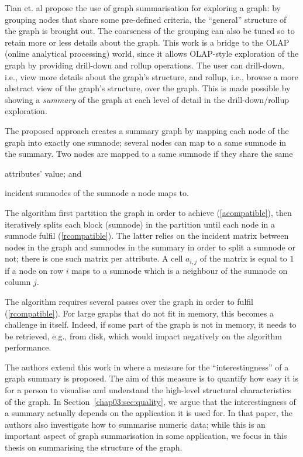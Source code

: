 Tian et. al \cite{tian:sigmod:2008} propose the use of graph summarisation for exploring a graph: by grouping nodes that share some pre-defined criteria, the ``general'' structure of the graph is brought out. The coarseness of the grouping can also be tuned so to retain more or less details about the graph. This work is a bridge to the OLAP (online analytical processing) world, since it allows OLAP-style exploration of the graph by providing drill-down and rollup operations. The user can drill-down, i.e., view more details about the graph's structure, and rollup, i.e., browse a more abstract view of the graph's structure, over the graph. This is made possible by showing a \emph{summary} of the graph at each level of detail in the drill-down/rollup exploration.

The proposed approach creates a summary graph by mapping each node of the graph into exactly one sumnode; several nodes can map to a same sumnode in the summary. Two nodes are mapped to a same sumnode if they share the same
\begin{inparaenum}[(a)]
	\item attributes' value; and
	\label{acompatible}
	\item incident sumnodes of the sumnode a node maps to.
	\label{rcompatible}
\end{inparaenum}
The algorithm first partition the graph in order to achieve (\ref{acompatible}), then iteratively splits each block (sumnode) in the partition until each node in a sumnode fulfil (\ref{rcompatible}). The latter relies on the incident matrix between nodes in the graph and sumnodes in the summary in order to split a sumnode or not; there is one such matrix per attribute. A cell $a_{i,j}$ of the matrix is equal to $1$ if a node on row $i$ maps to a sumnode which is a neighbour of the sumnode on column $j$.

The algorithm requires several passes over the graph in order to fulfil (\ref{rcompatible}). For large graphs that do not fit in memory, this becomes a challenge in itself. Indeed, if some part of the graph is not in memory, it needs to be retrieved, e.g., from disk, which would impact negatively on the algorithm performance.

The authors extend this work in \cite{zhang:2010:ddg} where a measure for the ``interestingness'' of a graph summary is proposed. The aim of this measure is to quantify how easy it is for a person to visualise and understand the high-level structural characteristics of the graph. In Section~\ref{chap03:sec:quality}, we argue that the interestingness of a summary actually depends on the application it is used for. In that paper, the authors also investigate how to summarise numeric data; while this is an important aspect of graph summarisation in some application, we focus in this thesis on summarising the structure of the graph.\\

